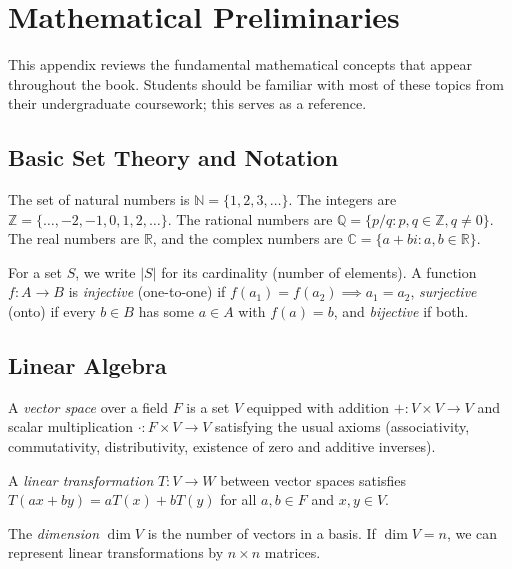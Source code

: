 \chapter{Mathematical Preliminaries}
\label{app:prerequisites}

This appendix reviews the fundamental mathematical concepts that appear throughout the book. Students should be familiar with most of these topics from their undergraduate coursework; this serves as a reference.

\section{Basic Set Theory and Notation}

\begin{definition}
The set of natural numbers is $\mathbb{N} = \{1, 2, 3, \ldots\}$. The integers are $\mathbb{Z} = \{\ldots, -2, -1, 0, 1, 2, \ldots\}$. The rational numbers are $\mathbb{Q} = \{p/q : p, q \in \mathbb{Z}, q \neq 0\}$. The real numbers are $\mathbb{R}$, and the complex numbers are $\mathbb{C} = \{a + bi : a, b \in \mathbb{R}\}$.
\end{definition}

For a set $S$, we write $|S|$ for its cardinality (number of elements). A function $f: A \to B$ is \textit{injective} (one-to-one) if $f(a_1) = f(a_2) \implies a_1 = a_2$, \textit{surjective} (onto) if every $b \in B$ has some $a \in A$ with $f(a) = b$, and \textit{bijective} if both.

\section{Linear Algebra}

\begin{definition}
A \textit{vector space} over a field $F$ is a set $V$ equipped with addition $+: V \times V \to V$ and scalar multiplication $\cdot: F \times V \to V$ satisfying the usual axioms (associativity, commutativity, distributivity, existence of zero and additive inverses).
\end{definition}

A \textit{linear transformation} $T: V \to W$ between vector spaces satisfies $T(ax + by) = aT(x) + bT(y)$ for all $a, b \in F$ and $x, y \in V$.

The \textit{dimension} $\dim V$ is the number of vectors in a basis. If $\dim V = n$, we can represent linear transformations by $n \times n$ matrices.

